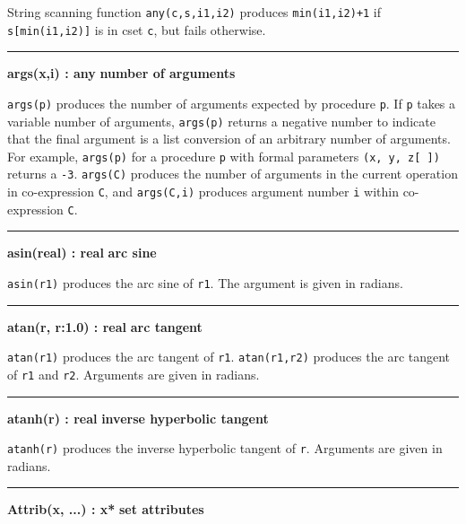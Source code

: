 \noindent
{}String scanning function
\texttt{any(c,s,i1,i2)} produces \texttt{min(i1,i2)+1} if \texttt{s[min(i1,i2)]}
is in cset \texttt{c}, but fails otherwise.

\bigskip
\hrule\vspace{0.1cm}
\noindent
{\bf args(x,i) : any } \hfill {\bf number of arguments}

\noindent
{}\texttt{args(p)} produces the number of arguments
expected by procedure \texttt{p}. If \texttt{p} takes a variable number
of arguments, \texttt{args(p)} returns a negative number to indicate
that the final argument is a list conversion of an arbitrary number of
arguments. For example, \texttt{args(p)} for a procedure \texttt{p}
with formal parameters \texttt{(x, y, z[ ])} returns a \texttt{{}-3}.
\texttt{args(C)} produces the number of arguments in the current
operation in co-expression \texttt{C}, and \texttt{args(C,i)} produces
argument number \texttt{i} within co-expression \texttt{C}.

\bigskip
\hrule\vspace{0.1cm}
\noindent
{\bf asin(real) : real } \hfill {\bf arc sine}

\noindent
{}\texttt{asin(r1)} produces the arc sine of \texttt{r1}.
The argument is given in radians.

\bigskip
\hrule\vspace{0.1cm}
\noindent
{\bf atan(r, r:1.0) : real } \hfill {\bf arc tangent}

\noindent
{}\texttt{atan(r1)} produces the arc tangent of
\texttt{r1}. \texttt{atan(r1,r2)} produces the arc tangent of
\texttt{r1} and \texttt{r2}. Arguments are given in radians.

\bigskip
\hrule\vspace{0.1cm}
\noindent
{\bf atanh(r) : real } \hfill {\bf inverse hyperbolic tangent}

\noindent
{}\texttt{atanh(r)} produces the inverse
hyperbolic tangent of \texttt{r}. Arguments are given in radians.

\bigskip
\hrule\vspace{0.1cm}
\noindent
{\bf Attrib(x, ...) : x* } \hfill {\bf set attributes}

